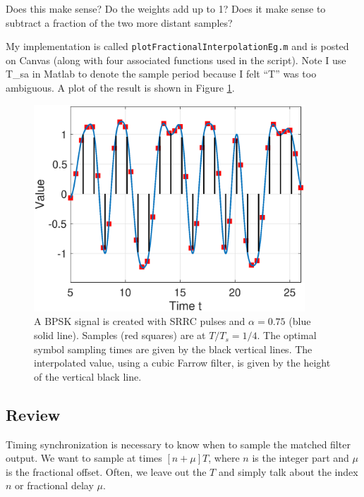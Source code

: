 Does this make sense?  Do the weights add up to 1?  Does it make
sense to subtract a fraction of the two more distant samples?



My implementation is called \texttt{plotFractionalInterpolationEg.m} and is posted on Canvas (along with four associated functions used in the script).  Note I use T\_sa in Matlab to denote the sample period because I felt ``T'' was too ambiguous.  A plot of the result is shown in Figure \ref{F:InterpEg}.

\begin{figure}[htbp]
  \centerline{\includegraphics[width=4in]{../images/plotFractionalInterpolationEg.eps}}
  \caption{A BPSK signal is created with SRRC pulses and $\alpha=0.75$ (blue solid line). Samples (red squares) are at $T/T_s = 1/4$.  The optimal symbol sampling times are given by the black vertical lines.  The interpolated value, using a cubic Farrow filter, is given by the height of the vertical black line. }
  \label{F:InterpEg}
\end{figure}

\subsection{Review}

Timing synchronization is necessary to know when to sample the
    matched filter output.  We want to sample at times
    $[n+\mu]T$, where $n$ is the integer part and $\mu$ is the
    fractional offset.     Often, we leave out the $T$ and simply talk about the index $n$ or fractional delay $\mu$.

